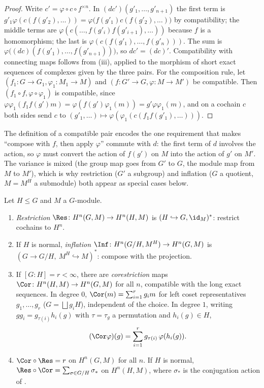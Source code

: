 \begin{proof}
Write $c'=\varphi\circ c\circ f^{\times n}$. In $(d c')(g'_1,\dots,g'_{n+1})$ the first term is $g'_1\varphi(c(f(g'_2),\dots))=\varphi\bigl(f(g'_1)c(f(g'_2),\dots)\bigr)$ by
compatibility; the middle terms are $\varphi(c(\dots,f(g'_i)f(g'_{i+1}),\dots))$ because $f$ is a homomorphism; the last is $\varphi(c(f(g'_1),\dots,f(g'_n)))$. The sum is
$\varphi\bigl((dc)(f(g'_1),\dots,f(g'_{n+1}))\bigr)$, so $dc'=(dc)'$. Compatibility with connecting maps follows from (iii), applied to
the morphism of short exact sequences of complexes given by the three pairs. For the composition rule, let $(f_1\colon G\to G_1,\varphi_1\colon M_1\to M)$ and
$(f\colon G'\to G,\varphi\colon M\to M')$ be compatible. Then $(f_1\circ f,\varphi\circ\varphi_1)$ is compatible, since
$\varphi\varphi_1(f_1f(g')m)=\varphi(f(g')\varphi_1(m))=g'\varphi\varphi_1(m)$, and on a cochain $c$ both sides send $c$ to
$(g'_1,\dots)\mapsto\varphi(\varphi_1(c(f_1f(g'_1),\dots)))$.
\end{proof}

The definition of a compatible pair encodes the one requirement that makes ``compose with $f$, then apply $\varphi$'' commute with $d$: the first term of
$d$ involves the action, so $\varphi$ must convert the action of $f(g')$ on $M$ into the action of $g'$ on $M'$. The variance is mixed (the group map goes from
$G'$ to $G$, the module map from $M$ to $M'$), which is why restriction ($G'$ a subgroup) and inflation ($G$ a quotient, $M=M^H$ a submodule) both appear as
special cases below.

\begin{proposition}\label{prop:cohomology:res-inf-cor}
Let $H\le G$ and $M$ a $G$-module.
\begin{enumerate}[label=(\alph*)]
\item \emph{Restriction} $\Res\colon H^n(G,M)\to H^n(H,M)$ is $(H\hookrightarrow G,\id_M)^*$: restrict cochains to $H^n$.
\item If $H$ is normal, \emph{inflation} $\Inf\colon H^n(G/H,M^H)\to H^n(G,M)$ is $(G\to G/H,\ M^H\hookrightarrow M)^*$: compose with the projection.
\item If $[G:H]=r<\infty$, there are \emph{corestriction} maps $\Cor\colon H^n(H,M)\to H^n(G,M)$ for all $n$, compatible with the long exact sequences. In
degree $0$, $\Cor(m)=\sum_{i=1}^rg_im$ for left coset representatives $g_1,\dots,g_r$ ($G=\bigsqcup g_iH$), independent of the choice. In degree $1$, writing
$gg_i=g_{\tau(i)}h_i(g)$ with $\tau=\tau_g$ a permutation and $h_i(g)\in H$,
\[
(\Cor\varphi)(g)=\sum_{i=1}^rg_{\tau(i)}\,\varphi(h_i(g)).
\]
\item $\Cor\circ\Res=r$ on $H^n(G,M)$ for all $n$. If $H$ is normal, $\Res\circ\Cor=\sum_{\sigma\in G/H}\sigma_*$ on $H^n(H,M)$, where $\sigma_*$ is the
conjugation action of .
\end{enumerate}
\end{proposition}

